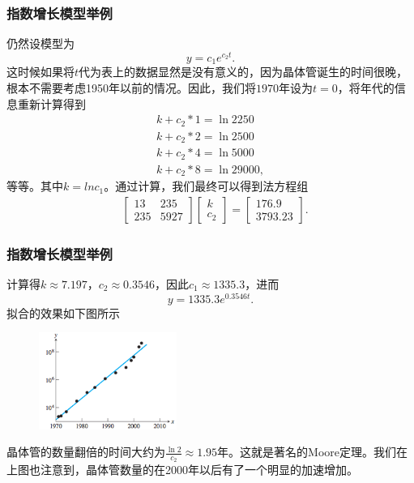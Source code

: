 \documentclass[10pt]{beamer}
\begin{document}
\begin{frame}
\frametitle{指数增长模型举例}
仍然设模型为
\begin{equation}
y = c_1 e^{c_2 t}.
\end{equation}
这时候如果将$t$代为表上的数据显然是没有意义的，因为晶体管诞生的时间很晚，根本不需要考虑1950年以前的情况。因此，我们将$1970$年设为$t = 0$，将年代的信息重新计算得到
\begin{align}
k + c_2 * 1= \ln 2250 \nonumber \\
k + c_2 * 2= \ln 2500 \nonumber \\
k + c_2 * 4= \ln 5000 \nonumber \\
k + c_2 * 8= \ln 29000,
\end{align}
等等。其中$k = ln c_1$。通过计算，我们最终可以得到法方程组
\begin{align}
&\left[ \begin{array}{cc}
     13    & 235    \\
     235    &   5927         
            \end{array} \right] 
\left[ \begin{array}{c} 
      k \\ c_2  \end{array} \right] 
=
\left[ \begin{array}{c}
      176.9 \\ 3793.23  \end{array} \right] .
\end{align}
\end{frame}


\begin{frame}
\frametitle{指数增长模型举例}
计算得$k \approx 7.197$，$c_2 \approx 0.3546$，因此$c_1  \approx 1335.3$，进而
\begin{equation}
y = 1335.3 e^{0.3546 t}.
\end{equation}
拟合的效果如下图所示
\begin{figure}
\includegraphics[width=4.5cm]{figs/4-2-2_Exponential_Growth-4} 
\end{figure}
晶体管的数量翻倍的时间大约为$\frac{\ln 2}{c_2} \approx 1.95$年。这就是著名的Moore定理。我们在上图也注意到，晶体管数量的在2000年以后有了一个明显的加速增加。
\end{frame}
\end{document}
